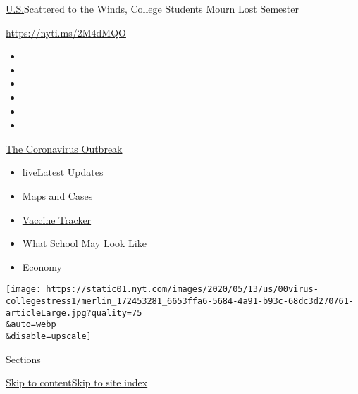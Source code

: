 \href{/section/us}{U.S.}\textbar{}Scattered to the Winds, College
Students Mourn Lost Semester

\url{https://nyti.ms/2M4dMQO}

\begin{itemize}
\item
\item
\item
\item
\item
\item
\end{itemize}

\href{https://www.nytimes.com/news-event/coronavirus?action=click\&pgtype=Article\&state=default\&region=TOP_BANNER\&context=storylines_menu}{The
Coronavirus Outbreak}

\begin{itemize}
\tightlist
\item
  live\href{https://www.nytimes.com/2020/08/02/world/coronavirus-updates.html?action=click\&pgtype=Article\&state=default\&region=TOP_BANNER\&context=storylines_menu}{Latest
  Updates}
\item
  \href{https://www.nytimes.com/interactive/2020/us/coronavirus-us-cases.html?action=click\&pgtype=Article\&state=default\&region=TOP_BANNER\&context=storylines_menu}{Maps
  and Cases}
\item
  \href{https://www.nytimes.com/interactive/2020/science/coronavirus-vaccine-tracker.html?action=click\&pgtype=Article\&state=default\&region=TOP_BANNER\&context=storylines_menu}{Vaccine
  Tracker}
\item
  \href{https://www.nytimes.com/interactive/2020/07/29/us/schools-reopening-coronavirus.html?action=click\&pgtype=Article\&state=default\&region=TOP_BANNER\&context=storylines_menu}{What
  School May Look Like}
\item
  \href{https://www.nytimes.com/live/2020/07/31/business/stock-market-today-coronavirus?action=click\&pgtype=Article\&state=default\&region=TOP_BANNER\&context=storylines_menu}{Economy}
\end{itemize}

\texttt{[image: https://static01.nyt.com/images/2020/05/13/us/00virus-collegestress1/merlin\_172453281\_6653ffa6-5684-4a91-b93c-68dc3d270761-articleLarge.jpg?quality=75\\\&auto=webp\\\&disable=upscale]}

Sections

\protect\hyperlink{site-content}{Skip to
content}\protect\hyperlink{site-index}{Skip to site index}

